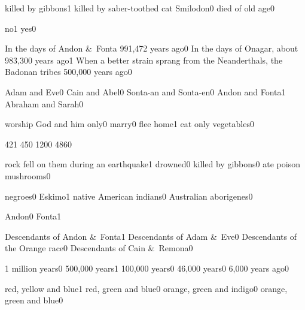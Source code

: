 {killed by gibbons}{1}
{killed by saber-toothed cat Smilodon}{0}
{died of old age}{0}
\qstop

{no}{1}
{yes}{0}
\qstop


{In the days of Andon \&\ Fonta 991,472 years ago}{0}
{In the days of Onagar, about 983,300 years ago}{1}
{When a better strain sprang from the Neanderthals, the Badonan tribes 500,000 years ago}{0}
\qstop

{Adam and Eve}{0}
{Cain and Abel}{0}
{Sonta\hyp{}an and Sonta\hyp{}en}{0}
{Andon and Fonta}{1}
{Abraham and Sarah}{0}
\qstop

{worship God and him only}{0}
{marry}{0}
{flee home}{1}
{eat only vegetables}{0}
\qstop

{42}{1}
{45}{0}
{120}{0}
{486}{0}
\qstop

{rock fell on them during an earthquake}{1}
{drowned}{0}
{killed by gibbons}{0}
{ate poison mushrooms}{0}
\qstop

{negroes}{0}
{Eskimo}{1}
{native American indians}{0}
{Australian aborigenes}{0}
\qstop

{Andon}{0}
{Fonta}{1}
\qstop

{Descendants of Andon \&\ Fonta}{1}
{Descendants of Adam \&\ Eve}{0}
{Descendants of the Orange race}{0}
{Descendants of Cain \&\ Remona}{0}
\qstop


{1 million years}{0}
{500,000 years}{1}
{100,000 years}{0}
{46,000 years}{0}
{6,000 years ago}{0}
\qstop

{red, yellow and blue}{1}
{red, green and blue}{0}
{orange, green and indigo}{0}
{orange, green and blue}{0}
\qstop

